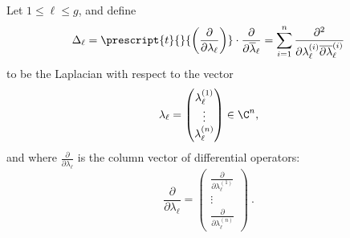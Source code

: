 \documentclass[11pt,letterpaper,english]{amsart}
\numberwithin{equation}{subsection}
\numberwithin{equation}{section}
\theoremstyle{plain}
\theoremstyle{remark}
\begin{document}
Let $1\leq \ell\leq g$, and define \[\Delta_\ell= \prescript{t}{}{\left(\frac{\partial}{\partial \lambda_\ell}\right)}\cdot\frac{\partial}{\partial \overline{\lambda}_\ell}=\sum_{i=1}^{n}\frac{\partial^2}{\partial \lambda_\ell^{(i)}\overline{\partial \lambda}_\ell^{(i)}}\] to be the Laplacian with respect to the vector 
\[\lambda_\ell=\begin{pmatrix}\lambda_\ell^{(1)}\\\vdots\\\lambda_\ell^{(n)}\end{pmatrix}\in\C^n,\]
and where $\frac{\partial}{\partial \lambda_\ell}$ is the column vector of differential operators: \[\frac{\partial}{\partial \lambda_\ell}=\begin{pmatrix}\frac{\partial}{\partial\lambda_\ell^{(1)}}\\\vdots\\\frac{\partial}{\partial\lambda_\ell^{(n)}}\end{pmatrix}~.\] 
\end{document}
